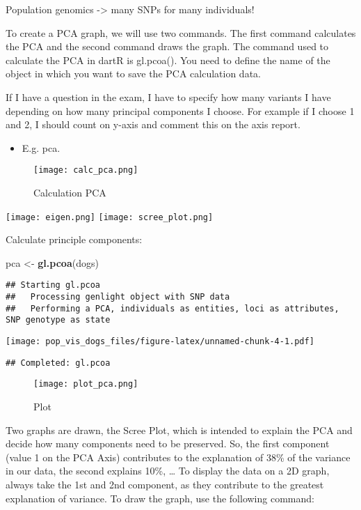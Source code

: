 \documentclass[
]{article}
\newenvironment{Shaded}{\begin{snugshade}}{\end{snugshade}}
\newcommand{\FunctionTok}[1]{\textcolor[rgb]{0.13,0.29,0.53}{\textbf{#1}}}
\newcommand{\NormalTok}[1]{#1}
\newcommand{\OtherTok}[1]{\textcolor[rgb]{0.56,0.35,0.01}{#1}}
\providecommand{\tightlist}{%
  \setlength{\itemsep}{0pt}\setlength{\parskip}{0pt}}
\begin{document}
Population genomics -\textgreater{} many SNPs for many individuals!

To create a PCA graph, we will use two commands. The first command
calculates the PCA and the second command draws the graph. The command
used to calculate the PCA in dartR is gl.pcoa(). You need to define the
name of the object in which you want to save the PCA calculation data.

If I have a question in the exam, I have to specify how many variants I
have depending on how many principal components I choose. For example if
I choose 1 and 2, I should count on y-axis and comment this on the axis
report.

\begin{itemize}
\tightlist
\item
  E.g. pca.
\end{itemize}

\begin{figure}
\centering
\texttt{[image: calc\_pca.png]}
\caption{Calculation PCA}
\end{figure}

\texttt{[image: eigen.png]} \texttt{[image: scree\_plot.png]}

Calculate principle components:

\begin{Shaded}
\begin{Highlighting}[]
\NormalTok{pca }\OtherTok{\textless{}{-}} \FunctionTok{gl.pcoa}\NormalTok{(dogs)}
\end{Highlighting}
\end{Shaded}

\begin{verbatim}
## Starting gl.pcoa 
##   Processing genlight object with SNP data
##   Performing a PCA, individuals as entities, loci as attributes, SNP genotype as state
\end{verbatim}

\texttt{[image: pop\_vis\_dogs\_files/figure-latex/unnamed-chunk-4-1.pdf]}

\begin{verbatim}
## Completed: gl.pcoa
\end{verbatim}

\begin{figure}
\centering
\texttt{[image: plot\_pca.png]}
\caption{Plot}
\end{figure}

Two graphs are drawn, the Scree Plot, which is intended to explain the
PCA and decide how many components need to be preserved. So, the first
component (value 1 on the PCA Axis) contributes to the explanation of
38\% of the variance in our data, the second explains 10\%, \ldots{} To
display the data on a 2D graph, always take the 1st and 2nd component,
as they contribute to the greatest explanation of variance. To draw the
graph, use the following command:
\end{document}
